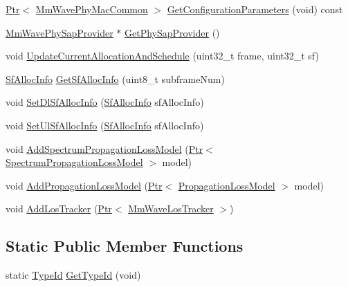 \begin{DoxyCompactItemize}
\item 
\hyperlink{classns3_1_1Ptr}{Ptr}$<$ \hyperlink{classns3_1_1MmWavePhyMacCommon}{Mm\+Wave\+Phy\+Mac\+Common} $>$ \hyperlink{classns3_1_1MmWavePhy_aa6f6e3d4538665d9d259c8403570440e}{Get\+Configuration\+Parameters} (void) const 
\item 
\hyperlink{classns3_1_1MmWavePhySapProvider}{Mm\+Wave\+Phy\+Sap\+Provider} $\ast$ \hyperlink{classns3_1_1MmWavePhy_a071130908634482b4a9d66383eb4b2db}{Get\+Phy\+Sap\+Provider} ()
\item 
void \hyperlink{classns3_1_1MmWavePhy_a0438225baec5ca6fb409415e6696b31a}{Update\+Current\+Allocation\+And\+Schedule} (uint32\+\_\+t frame, uint32\+\_\+t sf)
\item 
\hyperlink{structns3_1_1SfAllocInfo}{Sf\+Alloc\+Info} \hyperlink{classns3_1_1MmWavePhy_abba48f1a78aed536a2e8610479317fe8}{Get\+Sf\+Alloc\+Info} (uint8\+\_\+t subframe\+Num)
\item 
void \hyperlink{classns3_1_1MmWavePhy_a1365a253206b0805f65a2038e8e19357}{Set\+Dl\+Sf\+Alloc\+Info} (\hyperlink{structns3_1_1SfAllocInfo}{Sf\+Alloc\+Info} sf\+Alloc\+Info)
\item 
void \hyperlink{classns3_1_1MmWavePhy_a9481c699d85d1409e874c5f83d643c8c}{Set\+Ul\+Sf\+Alloc\+Info} (\hyperlink{structns3_1_1SfAllocInfo}{Sf\+Alloc\+Info} sf\+Alloc\+Info)
\item 
void \hyperlink{classns3_1_1MmWavePhy_a2ac25a75c50bf54b350bc0766a3f7962}{Add\+Spectrum\+Propagation\+Loss\+Model} (\hyperlink{classns3_1_1Ptr}{Ptr}$<$ \hyperlink{classns3_1_1SpectrumPropagationLossModel}{Spectrum\+Propagation\+Loss\+Model} $>$ model)
\item 
void \hyperlink{classns3_1_1MmWavePhy_a96fe33933620a1544a85c2fc695567bf}{Add\+Propagation\+Loss\+Model} (\hyperlink{classns3_1_1Ptr}{Ptr}$<$ \hyperlink{classns3_1_1PropagationLossModel}{Propagation\+Loss\+Model} $>$ model)
\item 
void \hyperlink{classns3_1_1MmWavePhy_aa360d84fb9a2be87326c520776e71b9b}{Add\+Los\+Tracker} (\hyperlink{classns3_1_1Ptr}{Ptr}$<$ \hyperlink{classns3_1_1MmWaveLosTracker}{Mm\+Wave\+Los\+Tracker} $>$)
\end{DoxyCompactItemize}
\subsection*{Static Public Member Functions}
\begin{DoxyCompactItemize}
\item 
static \hyperlink{classns3_1_1TypeId}{Type\+Id} \hyperlink{classns3_1_1MmWavePhy_a5dce05c9991d12d34e69a505f47af5a4}{Get\+Type\+Id} (void)
\end{DoxyCompactItemize}
